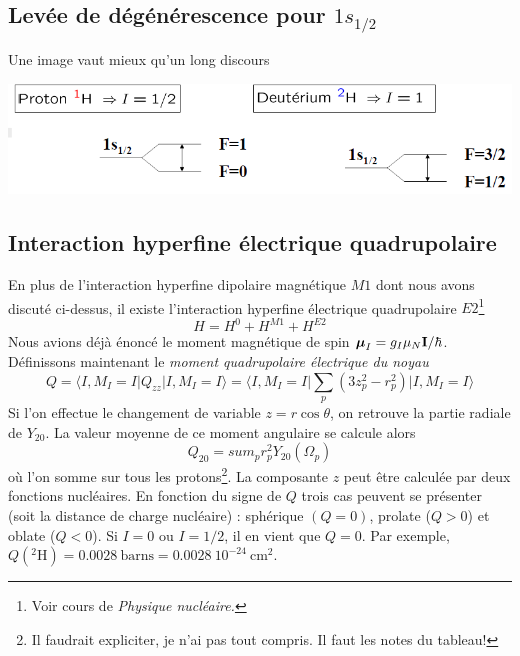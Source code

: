 \subsection{Levée de dégénérescence pour $1s_{1/2}$}
Une image vaut mieux qu'un long discours

\begin{center}
\includegraphics[scale=0.45]{ch1/image12}
\end{center}






\subsection{Interaction hyperfine électrique quadrupolaire}
En plus de l'interaction hyperfine dipolaire magnétique $M1$ dont nous avons discuté ci-dessus, il
existe l'interaction hyperfine électrique quadrupolaire $E2$\footnote{Voir cours de \textit{Physique
nucléaire.}}
\begin{equation}
H = H^0 + H^{M1} + H^{E2}
\end{equation}
Nous avions déjà énoncé le moment magnétique de spin $\mbox{\boldmath $ \mu $}_I = g_I \mu_N {\bf I}/
\hbar$. Définissons maintenant le \textit{moment quadrupolaire électrique du noyau}
\begin{equation}
Q = \langle I, M_I=I \vert Q_{zz} \vert I, M_I=I \rangle
= \langle I, M_I=I \vert \sum_p (3 z^2_p - r^2_p)  \vert I, M_I=I \rangle
\end{equation}
Si l'on effectue le changement de variable $z=r\cos\theta$, on retrouve la partie radiale de 
$Y_{20}$. La valeur moyenne de ce moment angulaire se calcule alors
\begin{equation}
Q_{20} = sum_p r_p^2 Y_{20}(\Omega_p)
\end{equation}
où l'on somme sur tous les protons\footnote{Il faudrait expliciter, je n'ai pas tout compris. Il 
faut les notes du tableau!}. La composante $z$ peut être calculée par deux fonctions
nucléaires. En fonction du signe de $Q$ trois cas peuvent se présenter (soit la distance de charge 
nucléaire) : sphérique $(Q=0)$, prolate ($Q>0$) et oblate ($Q<0$). Si $I=0$ ou $I=1/2$, il en vient
que $Q=0$. Par exemple, $Q(^2\mbox{H}) = 0.0028~\mbox{barns} = 0.0028~10^{-24}~\mbox{cm}^{2}$.



